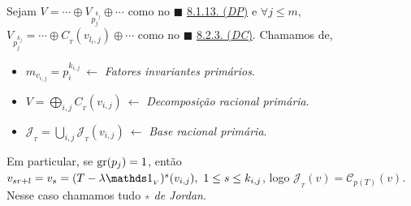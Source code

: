 \begin{definition}
    Sejam \(V =  \cdots \oplus V_{p_j^{k_j}} \oplus \cdots \) como no \(\blacksquare\) \hyperlink{thmDP}{8.1.13. (\emph{DP})} e \(\forall j\leq m\), \( V_{p_j^{k_j}} = \cdots \oplus C_{_T}(v_{l_i,j} )\oplus \cdots \) como no \(\blacksquare\) \hyperlink{thmDC}{8.2.3. (\emph{DC})}. Chamamos de, 
    \begin{itemize}[label = \(\star\)]
        \item \(m_{v_{i,j} }= p_i^{k_{i,j}} \ \leftarrow\) \emph{Fatores invariantes primários}. 
        \item \( \displaystyle V = \bigoplus_{i,j} C_{_T} (v_{i,j}) \ \leftarrow\) \emph{Decomposição racional primária}.
        \item \(\displaystyle \mathscr{J}_{_T} = \bigcup_{i,j} \mathscr{J}_{_T}(v_{i,j}) \ \leftarrow\) \emph{Base racional primária}.  
    \end{itemize}

\end{definition}

\begin{note}
    Em particular, se \(\operatorname{gr} (p_j) = 1\), então \(v_{sr+l} = v_s = (T - \lambda\id_{_V})^s(v_{i,j}), \ 1\leq s \leq k_{i,j}\), logo \(\mathscr{J}_{_T}(v) = \mathscr{C}_{p(T)}(v)\). Nesse caso chamamos tudo \textcolor{gray}{ \(\star\) } \emph{de Jordan}.     
\end{note}

